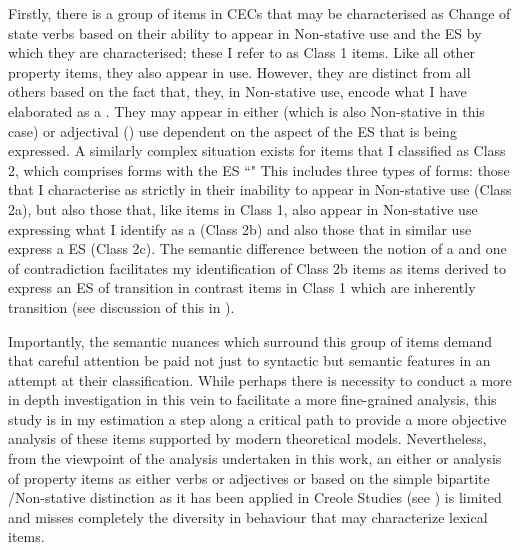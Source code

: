 Firstly, there is a group of items in CECs that may be characterised as Change of state verbs based on their ability to appear in Non-stative use and the ES by which they are characterised; these I refer to as Class 1 items. Like all other property items, they also appear in  use. However, they are distinct from all others based on the fact that, they, in Non-stative use, encode what I have elaborated as a . They may appear in either  (which is also Non-stative in this case) or adjectival () use dependent on the aspect of the ES that is being expressed. A similarly complex situation exists for items that I classified as Class 2, which comprises forms with the ES ``" This includes three types of forms: those that I characterise as strictly  in their inability to appear in Non-stative use (Class 2a), but also those that, like items in Class 1, also appear in Non-stative use expressing what I identify as a  (Class 2b) and also those that in similar use express a  ES (Class 2c). The semantic difference between the notion of a  and one of contradiction facilitates my identification of Class 2b items as  items derived to express an ES of transition in contrast items in Class 1 which are inherently transition (see discussion of this in ).

Importantly, the semantic nuances which surround this group of items demand that careful attention be paid not just to syntactic but semantic features in an attempt at their classification. While perhaps there is necessity to conduct a more in depth investigation in this vein to facilitate a more fine-grained analysis, this study is in my estimation a step along a critical path to provide a more objective analysis of these items supported by modern theoretical models. Nevertheless, from the viewpoint of the analysis undertaken in this work, an either or analysis of property items as either verbs or adjectives or based on the simple bipartite \slash Non-stative distinction as it has been applied in Creole Studies (see \citealt{Bickerton1975,Bickerton1981}) is limited and misses completely the diversity in behaviour that may characterize lexical items. 

